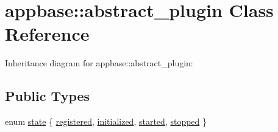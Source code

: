 \hypertarget{classappbase_1_1abstract__plugin}{}\section{appbase\+:\+:abstract\+\_\+plugin Class Reference}
\label{classappbase_1_1abstract__plugin}


Inheritance diagram for appbase\+:\+:abstract\+\_\+plugin\+:
\subsection*{Public Types}
\begin{DoxyCompactItemize}
\item 
enum \mbox{\hyperlink{classappbase_1_1abstract__plugin_a4a997c146c27d5baf538a6c987c86408}{state}} \{ \mbox{\hyperlink{classappbase_1_1abstract__plugin_a4a997c146c27d5baf538a6c987c86408ac712ce3482a78b8bf87080aefd77cf7d}{registered}}, 
\mbox{\hyperlink{classappbase_1_1abstract__plugin_a4a997c146c27d5baf538a6c987c86408a9ae208bba76e9c0eab1cac52953f947b}{initialized}}, 
\mbox{\hyperlink{classappbase_1_1abstract__plugin_a4a997c146c27d5baf538a6c987c86408a808ebbf475942017567644697eca3224}{started}}, 
\mbox{\hyperlink{classappbase_1_1abstract__plugin_a4a997c146c27d5baf538a6c987c86408a320c2eebb5306f385aebfca07336d29e}{stopped}}
 \}
\end{DoxyCompactItemize}
